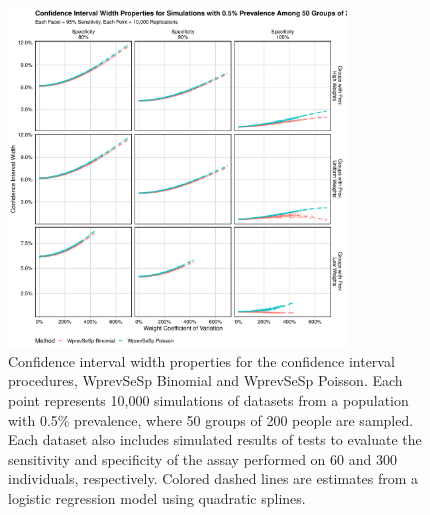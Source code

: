 \begin{figure}
\centering
\includegraphics[width=0.8\textwidth]{imperfect_confidence_interval_width_50_groups_0_005_prev}
\caption{Confidence interval width properties for the confidence interval procedures, WprevSeSp Binomial and WprevSeSp Poisson.
Each point represents 10,000 simulations of datasets from a population with 0.5\% prevalence, where 50 groups of 200 people are sampled.
Each dataset also includes simulated results of tests to evaluate the sensitivity and specificity of the assay performed on 60 and 300 individuals, respectively.
Colored dashed lines are estimates from a logistic regression model using quadratic splines.}
\label{ch_3:fig:imperfect_confidence_interval_width_50_groups_0_005_prev}
\end{figure}


